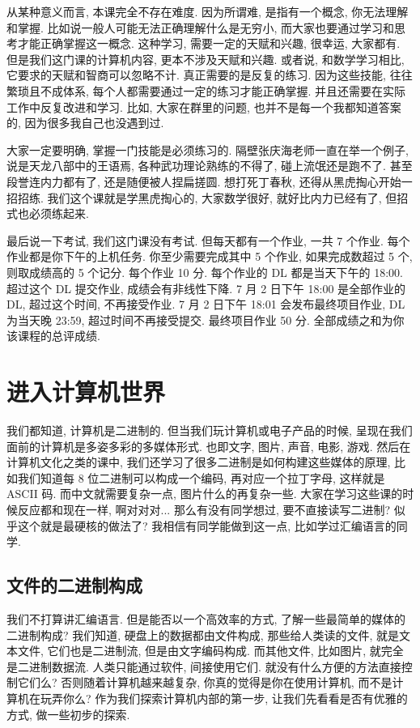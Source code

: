 \documentclass[a4paper]{ctexart}
\begin{document}
从某种意义而言, 本课完全不存在难度. 因为所谓难, 是指有一个概念, 你无法理解和掌握.
比如说一般人可能无法正确理解什么是无穷小, 而大家也要通过学习和思考才能正确掌握这一概念. 这种学习,
需要一定的天赋和兴趣, 很幸运, 大家都有. 但是我们这门课的计算机内容, 更本不涉及天赋和兴趣. 或者说,
和数学学习相比, 它要求的天赋和智商可以忽略不计. 真正需要的是反复的练习. 因为这些技能,
往往繁琐且不成体系, 每个人都需要通过一定的练习才能正确掌握. 并且还需要在实际工作中反复改进和学习.
比如, 大家在群里的问题, 也并不是每一个我都知道答案的, 因为很多我自己也没遇到过.

大家一定要明确, 掌握一门技能是必须练习的. 隔壁张庆海老师一直在举一个例子, 说是天龙八部中的王语焉,
各种武功理论熟练的不得了, 碰上流氓还是跑不了. 甚至段誉连内力都有了, 还是随便被人捏扁搓圆.
想打死丁春秋, 还得从黑虎掏心开始一招招练. 我们这个课就是学黑虎掏心的, 大家数学很好, 就好比内力已经有了, 但招式也必须练起来.

最后说一下考试, 我们这门课没有考试. 但每天都有一个作业, 一共 7 个作业.
每个作业都是你下午的上机任务. 你至少需要完成其中 5 个作业, 如果完成数超过 5 个,
则取成绩高的 5 个记分. 每个作业 10 分. 每个作业的 DL 都是当天下午的 18:00.
超过这个 DL 提交作业, 成绩会有非线性下降. 7 月 2 日下午 18:00 是全部作业的 DL,
超过这个时间, 不再接受作业. 7 月 2 日下午 18:01 会发布最终项目作业, DL
为当天晚 23:59, 超过时间不再接受提交. 最终项目作业 50 分.
全部成绩之和为你该课程的总评成绩.

\section{进入计算机世界}

我们都知道, 计算机是二进制的. 但当我们玩计算机或电子产品的时候, 呈现在我们面前的计算机是多姿多彩的多媒体形式.
也即文字, 图片, 声音, 电影, 游戏. 然后在计算机文化之类的课中, 我们还学习了很多二进制是如何构建这些媒体的原理,
比如我们知道每 8 位二进制可以构成一个编码, 再对应一个拉丁字母, 这样就是 ASCII 码. 而中文就需要复杂一点,
图片什么的再复杂一些. 大家在学习这些课的时候反应都和现在一样, 啊对对对... 那么有没有同学想过,
要不直接读写二进制? 似乎这个就是最硬核的做法了? 我相信有同学能做到这一点, 比如学过汇编语言的同学.

\subsection{文件的二进制构成}
我们不打算讲汇编语言. 但是能否以一个高效率的方式, 了解一些最简单的媒体的二进制构成? 我们知道,
硬盘上的数据都由文件构成, 那些给人类读的文件, 就是文本文件, 它们也是二进制流, 但是由文字编码构成.
而其他文件, 比如图片, 就完全是二进制数据流. 人类只能通过软件, 间接使用它们.
就没有什么方便的方法直接控制它们么? 否则随着计算机越来越复杂, 你真的觉得是你在使用计算机,
而不是计算机在玩弄你么? 作为我们探索计算机内部的第一步, 让我们先看看是否有优雅的方式,
做一些初步的探索.
\end{document}
